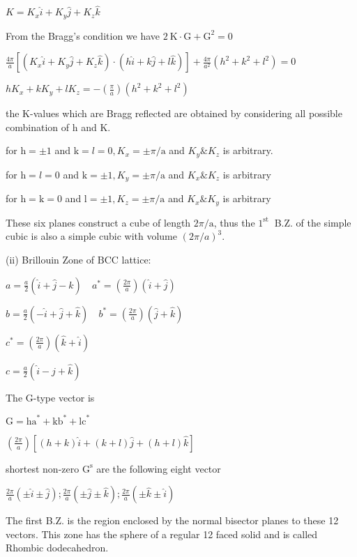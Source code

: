 $K=K_{x} \hat{i}+K_{y} \hat{j}+K_{z} \hat{k}$

From the Bragg's condition we have $2 \mathrm{~K} \cdot \mathrm{G}+\mathrm{G}^{2}=0$

$\frac{4 \pi}{a}\left[\left(K_{x} \hat{i}+K_{y} \hat{j}+K_{z} \hat{k}\right) \cdot(h \hat{i}+k \hat{j}+l \hat{k})\right]+\frac{4 \pi}{a^{2}}\left(h^{2}+k^{2}+l^{2}\right)=0$

$h K_{x}+k K_{y}+l K_{z}=-\left(\frac{\pi}{a}\right)\left(h^{2}+k^{2}+l^{2}\right)$

the $\mathrm{K}$-values which are Bragg reflected are obtained by considering all possible combination of $\mathrm{h}$ and $\mathrm{K}$.

for $\mathrm{h}=\pm 1$ and $\mathrm{k}=l=0, K_{x}=\pm \pi / \mathrm{a}$ and $K_{y} \& K_{z}$ is arbitrary.

for $\mathrm{h}=l=0$ and $\mathrm{k}=\pm 1, K_{y}=\pm \pi / \mathrm{a}$ and $K_{x} \& K_{z}$ is arbitrary

for $\mathrm{h}=\mathrm{k}=0$ and $\mathrm{l}=\pm 1, K_{z}=\pm \pi / \mathrm{a}$ and $K_{x} \& K_{y}$ is arbitrary

These six planes construct a cube of length $2 \pi / \mathrm{a}$, thus the $1^{\text {st }}$ B.Z. of the simple cubic is also a simple cubic with volume $(2 \pi / a)^{3}$. 



(ii) Brillouin Zone of $\mathrm{BCC}$ lattice:

$a=\frac{a}{2}(\hat{i}+\hat{j}-\hat{k}) \quad a^{*}=\left(\frac{2 \pi}{a}\right)(\hat{i}+\hat{j})$

$b=\frac{a}{2}(-\hat{i}+\hat{j}+\hat{k}) \quad b^{*}=\left(\frac{2 \pi}{a}\right)(\hat{j}+\hat{k})$



$c^{*}=\left(\frac{2 \pi}{a}\right)(\hat{k}+\hat{i})$

$c=\frac{a}{2}(\hat{i}-\hat{j}+\hat{k})$

The G-type vector is

$\mathrm{G}=\mathrm{ha}^{*}+\mathrm{kb}^{*}+\mathrm{lc}^{*}$

$\left(\frac{2 \pi}{a}\right)[(h+k) \hat{i}+(k+l) \hat{j}+(h+l) \hat{k}]$

shortest non-zero $\mathrm{G}^{\mathrm{s}}$ are the following eight vector

$\frac{2 \pi}{a}(\pm \hat{i} \pm \hat{j}) ; \frac{2 \pi}{a}(\pm \hat{j} \pm \hat{k}) ; \frac{2 \pi}{a}(\pm \hat{k} \pm \hat{i})$

The first B.Z. is the region enclosed by the normal bisector planes to these 12 vectors. This zone has the sphere of a regular 12 faced solid and is called Rhombic dodecahedron.

